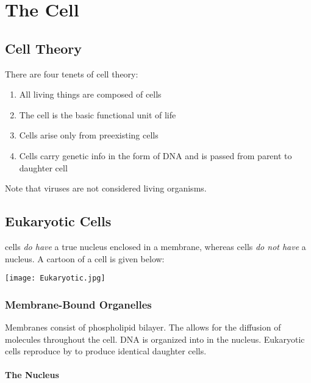 \documentclass[../Bio_chemistryReview.tex]{subfiles}
\begin{document}
	
\chapter{The Cell\supdag}
	
\section{Cell Theory\supdag}
\begin{infobox}
  There are four tenets of cell theory:
  \begin{enumerate}
    \item All living things are composed of cells
    \item The cell is the basic functional unit of life
    \item Cells arise only from preexisting cells
    \item Cells carry genetic info in the form of DNA and is passed from parent
      to daughter cell 
  \end{enumerate}
\end{infobox}
Note that viruses are not considered living organisms.

\section{Eukaryotic Cells\supdag}

 cells \emph{do have} a true nucleus enclosed in a membrane,
whereas  cells \emph{do not have} a nucleus. A cartoon of a
cell is given below:

\begin{center}
  \texttt{[image: Eukaryotic.jpg]}
\end{center}

\subsection{Membrane-Bound Organelles\supdag}
		
Membranes consist of phospholipid bilayer. The  allows for the
diffusion of molecules throughout the cell. DNA is organized into
 in the nucleus. Eukaryotic cells reproduce by
 to produce identical daughter cells.

\subsubsection{The Nucleus\supdag}
\end{document}
